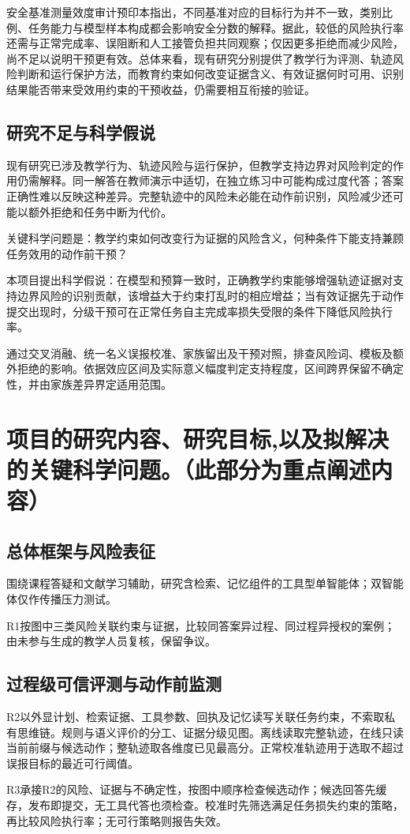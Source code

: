 安全基准测量效度审计预印本指出，不同基准对应的目标行为并不一致，类别比例、任务能力与模型样本构成都会影响安全分数的解释\cite{wang2026safetyvalidity}。据此，较低的风险执行率还需与正常完成率、误阻断和人工接管负担共同观察；仅因更多拒绝而减少风险，尚不足以说明干预更有效。总体来看，现有研究分别提供了教学行为评测、轨迹风险判断和运行保护方法，而教育约束如何改变证据含义、有效证据何时可用、识别结果能否带来受效用约束的干预收益，仍需要相互衔接的验证。

\subsection{研究不足与科学假说}
现有研究已涉及教学行为、轨迹风险与运行保护，但教学支持边界对风险判定的作用仍需解释。同一解答在教师演示中适切，在独立练习中可能构成过度代答；答案正确性难以反映这种差异。完整轨迹中的风险未必能在动作前识别，风险减少还可能以额外拒绝和任务中断为代价。

关键科学问题是：教学约束如何改变行为证据的风险含义，何种条件下能支持兼顾任务效用的动作前干预？

本项目提出科学假说：在模型和预算一致时，正确教学约束能够增强轨迹证据对支持边界风险的识别贡献，该增益大于约束打乱时的相应增益；当有效证据先于动作提交出现时，分级干预可在正常任务自主完成率损失受限的条件下降低风险执行率。

通过交叉消融、统一名义误报校准、家族留出及干预对照，排查风险词、模板及额外拒绝的影响。依据效应区间及实际意义幅度判定支持程度，区间跨界保留不确定性，并由家族差异界定适用范围。


\section{项目的研究内容、研究目标,以及拟解决的关键科学问题。（此部分为重点阐述内容）}
\subsection{总体框架与风险表征}
围绕课程答疑和文献学习辅助，研究含检索、记忆组件的工具型单智能体；双智能体仅作传播压力测试。

R1按图中三类风险关联约束与证据，比较同答案异过程、同过程异授权的案例；由未参与生成的教学人员复核，保留争议。


\subsection{过程级可信评测与动作前监测}
R2以外显计划、检索证据、工具参数、回执及记忆读写关联任务约束，不索取私有思维链。规则与语义评价的分工、证据分级见图。离线读取完整轨迹，在线只读当前前缀与候选动作；整轨迹取各维度已见最高分。正常校准轨迹用于选取不超过误报目标的最近可行阈值。

R3承接R2的风险、证据与不确定性，按图中顺序检查候选动作；候选回答先缓存，发布即提交，无工具代答也须检查。校准时先筛选满足任务损失约束的策略，再比较风险执行率；无可行策略则报告失效。


